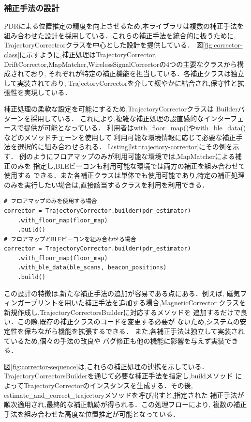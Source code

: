 
\subsubsection{補正手法の設計}

PDRによる位置推定の精度を向上させるため,本ライブラリは複数の補正手法を
組み合わせた設計を採用している．これらの補正手法を統合的に扱うために,
TrajectoryCorrectrorクラスを中心とした設計を提供している．
図\ref{fig:corrector-class}に示すように,補正処理はTrajectoryCorrector,
DriftCorrector,MapMatcher,WirelessSignalCorrectorの4つの主要なクラスから構成されており,
それぞれが特定の補正機能を担当している．各補正クラスは独立して実装されており,
TrajectoryCorrectorを介して緩やかに結合され,保守性と拡張性を実現している．

補正処理の柔軟な設定を可能にするため,TrajectoryCorrectorクラスは
Builderパターンを採用している．
これにより,複雑な補正処理の設直感的なインターフェースで提供が可能となっている．
利用者はwith\_floor\_map()やwith\_ble\_data()などのメソッドチェーンを使用して
利用可能な環境情報に応じて必要な補正手法を選択的に組み合わせられる．
Listing\ref{lst:trajectory-corrector}にその例を示す．
例のようにフロアマップのみが利用可能な環境では,MapMatcherによる補正のみを
指定し,BLEビーコンも利用可能な環境では両方の補正を組み合わせて使用する
できる．また各補正クラスは単体でも使用可能であり,特定の補正処理
のみを実行したい場合は,直接該当するクラスを利用を利用できる．

\begin{lstlisting}[caption={TrajectoryCorrectorの使用例},label=lst:trajectory-corrector,float=h]
# フロアマップのみを使用する場合
corrector = TrajectoryCorrector.builder(pdr_estimator)
    .with_floor_map(floor_map)
    .build()
# フロアマップとBLEビーコンを組み合わせる場合
corrector = TrajectoryCorrector.builder(pdr_estimator)
    .with_floor_map(floor_map)
    .with_ble_data(ble_scans, beacon_positions)
    .build()
\end{lstlisting}

この設計の特徴は,新たな補正手法の追加が容易である点にある．例えば,
磁気フィンガープリントを用いた補正手法を追加する場合,MagneticCorrector
クラスを新規作成し,TrajectoryCorrectorsBuilderに対応するメソッドを
追加するだけで良い．この際,既存の補正クラスのコードを変更する必要が
ないため,システムの安定性を保ちながら機能を拡張するできる．
また,各補正手法は独立して実装されているため,個々の手法の改良や
バグ修正も他の機能に影響を与えず実装できる．

図\ref{fig:corrector-sequence}は,これらの補正処理の連携を示している．
TrajectoryCorrectorsBuilderを通じて必要な補正手法を指定し,buildメソッド
によってTrajectoryCorrectorのインスタンスを生成する．その後,
estimate\_and\_correct\_trajectoryメソッドを呼び出すと,指定された
補正手法が順次適用され,最終的な補正軌跡が得られる．この処理フローにより,
複数の補正手法を組み合わせた高度な位置推定が可能となっている．


